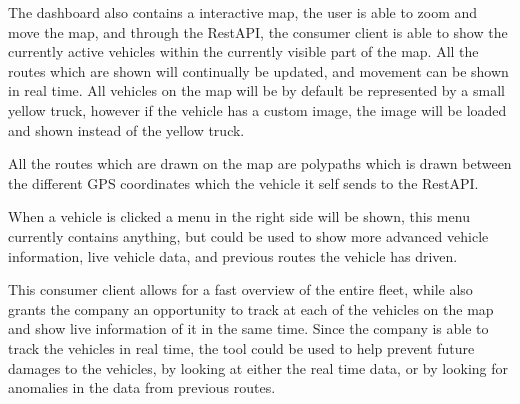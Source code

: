 \bigskip
The dashboard also contains a interactive map, the user is able to zoom and move the map, and through the RestAPI, the consumer client is able to show the currently active vehicles within the currently visible part of the map.
All the routes which are shown will continually be updated, and movement can be shown in real time.
All vehicles on the map will be by default be represented by a small yellow truck, however if the vehicle has a custom image, the image will be loaded and shown instead of the yellow truck.


All the routes which are drawn on the map are polypaths which is drawn between the different GPS coordinates which the vehicle it self sends to the RestAPI.

\bigskip
{}
When a vehicle is clicked a menu in the right side will be shown, this menu currently contains anything, but could be used to show more advanced vehicle information, live vehicle data, and previous routes the vehicle has driven.

\bigskip
This consumer client allows for a fast overview of the entire fleet, while also grants the company an opportunity to track at each of the vehicles on the map and show live information of it in the same time.
Since the company is able to track the vehicles in real time, the tool could be used to help prevent future damages to the vehicles, by looking at either the real time data, or by looking for anomalies in the data from previous routes.

